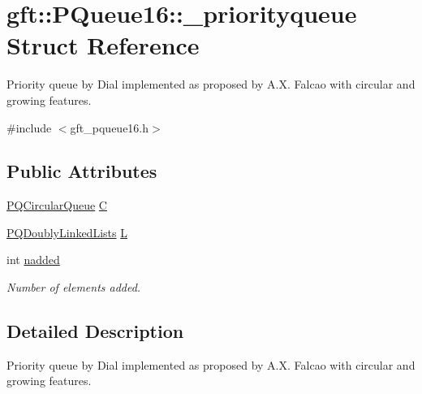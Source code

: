 \hypertarget{structgft_1_1PQueue16_1_1__priorityqueue}{\section{gft\-:\-:P\-Queue16\-:\-:\-\_\-priorityqueue Struct Reference}
\label{structgft_1_1PQueue16_1_1__priorityqueue}
}


Priority queue by Dial implemented as proposed by A.\-X. Falcao with circular and growing features.  




{\ttfamily \#include $<$gft\-\_\-pqueue16.\-h$>$}

\subsection*{Public Attributes}
\begin{DoxyCompactItemize}
\item 
\hyperlink{namespacegft_1_1PQueue16_a9170c804b2c99b8035274bfc820f968e}{P\-Q\-Circular\-Queue} \hyperlink{structgft_1_1PQueue16_1_1__priorityqueue_a3b00179eb83c3aceea4078e4b5e4fb53}{C}
\item 
\hyperlink{namespacegft_1_1PQueue16_a2e506a5582bb0b3b911d561e82164a46}{P\-Q\-Doubly\-Linked\-Lists} \hyperlink{structgft_1_1PQueue16_1_1__priorityqueue_a88a19657df74ff6d933e82ca2aacbb7e}{L}
\item 
int \hyperlink{structgft_1_1PQueue16_1_1__priorityqueue_a1d36f79c71162c0d7c8cfb5cc9a56150}{nadded}
\begin{DoxyCompactList}\small\item\em Number of elements added. \end{DoxyCompactList}\end{DoxyCompactItemize}


\subsection{Detailed Description}
Priority queue by Dial implemented as proposed by A.\-X. Falcao with circular and growing features. 

